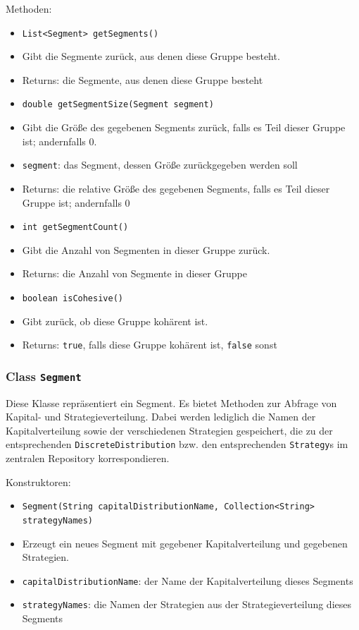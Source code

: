 \documentclass[parskip=full,11pt]{scrartcl}
\begin{document}
Methoden:
\begin{itemize}\itemsep -10pt
\item \texttt{List<Segment> getSegments()}
\item[] Gibt die Segmente zurück, aus denen diese Gruppe besteht.
\item[] Returns: die Segmente, aus denen diese Gruppe besteht

\item \texttt{double getSegmentSize(Segment segment)}
\item[] Gibt die Größe des gegebenen Segments zurück, falls es Teil dieser Gruppe ist; andernfalls \(0\).
\item[] \texttt{segment}: das Segment, dessen Größe zurückgegeben werden soll
\item[] Returns: die relative Größe des gegebenen Segments, falls es Teil dieser Gruppe ist; andernfalls \(0\)

\item \texttt{int getSegmentCount()}
\item[] Gibt die Anzahl von Segmenten in dieser Gruppe zurück.
\item[] Returns: die Anzahl von Segmente in dieser Gruppe

\item \texttt{boolean isCohesive()}
\item[] Gibt zurück, ob diese Gruppe kohärent ist.
\item[] Returns: \texttt{true}, falls diese Gruppe kohärent ist, \texttt{false} sonst
\end{itemize}

\subsubsection{Class \texttt{Segment}}

Diese Klasse repräsentiert ein Segment. Es bietet Methoden zur Abfrage von Kapital- und Strategieverteilung. Dabei werden lediglich die Namen der Kapitalverteilung sowie der verschiedenen Strategien gespeichert, die zu der entsprechenden \texttt{DiscreteDistribution} bzw. den entsprechenden \texttt{Strategy}s im zentralen Repository korrespondieren.

Konstruktoren:
\begin{itemize}\itemsep -10pt
\item \texttt{Segment(String capitalDistributionName, Collection<String> strategyNames)}
\item[] Erzeugt ein neues Segment mit gegebener Kapitalverteilung und gegebenen Strategien.
\item[] \texttt{capitalDistributionName}: der Name der Kapitalverteilung dieses Segments
\item[] \texttt{strategyNames}: die Namen der Strategien aus der Strategieverteilung dieses Segments
\end{itemize}
\end{document}
